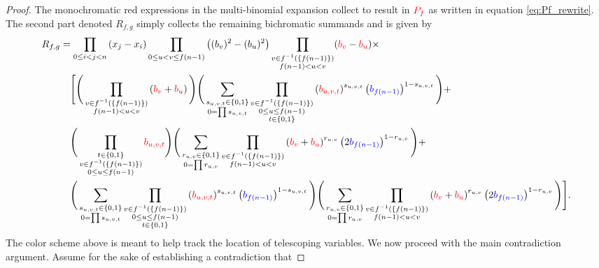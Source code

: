 \begin{proof}
The monochromatic red expressions in the multi-binomial expansion collect to result in ${\color{red}P_{f}}$ as written in equation \eqref{eq:Pf_rewrite}.
The second part denoted $R_{f,g}$ simply collects the remaining bichromatic
summands and is given by
\[
\begin{aligned}R_{f,g} & =\prod_{0\leq i<j<n}\left(x_{j}-x_{i}\right)\prod_{0\leq u<v\leq f(n-1)}\big((b_{v})^{2}-(b_{u})^{2}\big)\prod_{\substack{v\in f^{-1}(\{f(n-1)\})\\
f(n-1)<u<v
}
}({\color{red}b_{v}}-{\color{red}b_{u}})\times\\
 & \quad\Bigg[\Bigg(\prod_{\substack{v\in f^{-1}(\{f(n-1)\})\\
f(n-1)<u<v
}
}\left({\color{red}b_{v}}+{\color{red}b_{u}}\right)\Bigg)\Bigg(\sum_{\substack{s_{u,v,t}\in\{0,1\}\\
0=\prod s_{u,v,t}
}
}\prod_{\substack{v\in f^{-1}(\{f(n-1)\})\\
0\leq u\leq f(n-1)\\
t\in\{0,1\}
}
}\left({\color{red}b_{u,v,t}}\right)^{s_{u,v,t}}\left({\color{blue}b_{f(n-1)}}\right)^{1-s_{u,v,t}}\Bigg)+\\
 & \quad\Bigg(\prod_{\substack{t\in\{0,1\}\\
v\in f^{-1}(\{f(n-1)\})\\
0\leq u\leq f(n-1)
}
}{\color{red}b_{u,v,t}}\Bigg)\Bigg(\sum_{\substack{r_{u,v}\in\{0,1\}\\
0=\prod r_{u,v}
}
}\prod_{\substack{v\in f^{-1}(\{f(n-1)\})\\
f(n-1)<u<v
}
}\left({\color{red}b_{v}}+{\color{red}b_{u}}\right)^{r_{u,v}}\left(2{\color{blue}b_{f(n-1)}}\right)^{1-r_{u,v}}\Bigg)+\\
 & \quad\Bigg(\sum_{\substack{s_{u,v,t}\in\{0,1\}\\
0=\prod s_{u,v,t}
}
}\prod_{\substack{v\in f^{-1}(\{f(n-1)\})\\
0\leq u\leq f(n-1)\\
t\in\{0,1\}
}
}\left({\color{red}b_{u,v,t}}\right)^{s_{u,v,t}}\left({\color{blue}b_{f(n-1)}}\right)^{1-s_{u,v,t}}\Bigg)\Bigg(\sum_{\substack{r_{u,v}\in\{0,1\}\\
0=\prod r_{u,v}
}
}\prod_{\substack{v\in f^{-1}(\{f(n-1)\})\\
f(n-1)<u<v
}
}\left({\color{red}b_{v}}+{\color{red}b_{u}}\right)^{r_{u,v}}\left(2{\color{blue}b_{f(n-1)}}\right)^{1-r_{u,v}}\Bigg)\Bigg].
\end{aligned}
\]
The color scheme above is meant to help track the location of telescoping variables. We now proceed with the main contradiction argument. Assume for the sake of establishing a contradiction that

\end{proof}
